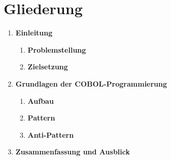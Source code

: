 \section{Gliederung}

\begin{framed}
\begin{enumerate}[label=\arabic*.]
	\item 
    	\textbf{Einleitung} 
    	\begin{enumerate}[label=\arabic*.]
    		\item \textbf{Problemstellung}
        	\item \textbf{Zielsetzung}
    	\end{enumerate}
    \item \textbf{Grundlagen der COBOL-Programmierung}
    	\begin{enumerate}[label=\arabic*.]
    	\item \textbf{Aufbau}
        \item \textbf{Pattern}
        \item \textbf{Anti-Pattern}
    	\end{enumerate}
     \item \textbf{Zusammenfassung und Ausblick}
\end{enumerate}
\end{framed}